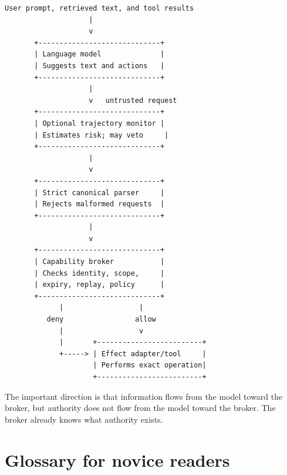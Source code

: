 \documentclass[11pt]{article}
\begin{document}
\begin{Verbatim}[fontsize=\small]
 User prompt, retrieved text, and tool results
                    |
                    v
       +-----------------------------+
       | Language model              |
       | Suggests text and actions   |
       +-----------------------------+
                    |
                    v   untrusted request
       +-----------------------------+
       | Optional trajectory monitor |
       | Estimates risk; may veto     |
       +-----------------------------+
                    |
                    v
       +-----------------------------+
       | Strict canonical parser     |
       | Rejects malformed requests  |
       +-----------------------------+
                    |
                    v
       +-----------------------------+
       | Capability broker           |
       | Checks identity, scope,     |
       | expiry, replay, policy      |
       +-----------------------------+
             |                  |
          deny                 allow
             |                  v
             |       +-------------------------+
             +-----> | Effect adapter/tool     |
                     | Performs exact operation|
                     +-------------------------+
\end{Verbatim}

The important direction is that information flows from the model toward the broker, but authority does not flow from the model toward the broker. The broker already knows what authority exists.

\section{Glossary for novice readers}
\end{document}
